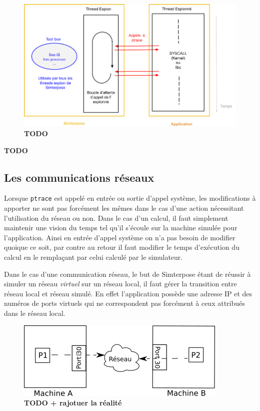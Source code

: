 \begin{figure}[H]
  \centering \includegraphics[scale=0.5]{Pictures/png/Simterpose_orga_code_v3}
  \caption{{\color{red} \textbf{TODO}}}
  \label{Organisation_Simterpose}
\end{figure}

{\color{red} \textbf{TODO}}

\subsection{Les communications réseaux}

Lorsque \texttt{ptrace} est appelé en entrée ou sortie d'appel système, les modifications
à apporter ne sont pas forcément les mêmes dans le cas d'une action nécessitant
l'utilisation du réseau ou non. Dans le cas d'un calcul, il faut simplement
maintenir une vision du temps tel qu'il s'écoule sur la machine simulée pour
l'application. Ainsi en entrée d'appel système on n'a pas besoin de modifier
quoique ce soit, par contre au retour il faut modifier le temps d'exécution du
calcul en le remplaçant par celui calculé par le simulateur.

Dans le cas d'une communication réseau, le but de Simterpose étant de réussir à
simuler un réseau \textit{virtuel} sur un réseau local, il faut gérer la
transition entre réseau local et réseau simulé. En effet l'application possède
une adresse IP et des numéros de ports virtuels qui ne correspondent pas
forcément à ceux attribués dans le réseau local.

\begin{figure}[H]
  \centering
  \includegraphics[scale=0.5]{Pictures/png/Mediation_realite}
  \caption{{\color{red} \textbf{TODO + rajotuer la réalité}}}
  \label{COMM_REALITE}
\end{figure}

